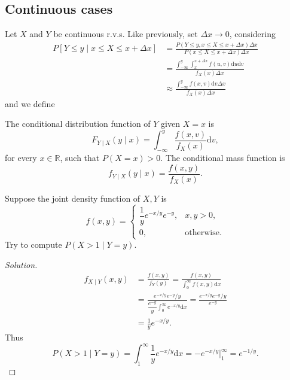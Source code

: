 \documentclass[11pt,singlecolumn, openany, citestyle=authoryear]{elegantbook}
\begin{document}
\begin{CJK}{UTF8}{gbsn}
\subsection{Continuous cases}
Let $X$ and $Y$ be continuous r.v.s. Like previously, set $\Delta x \to 0$, considering
\begin{align*}
    P[Y\leqslant y \mid x \leqslant X \leqslant x+\Delta x] &= 
    \frac{P(Y\leqslant y, x \leqslant X \leqslant x+\Delta x)\Delta x}
    {P(x \leqslant X \leqslant x+\Delta x)\Delta x}\\
    &= \frac{\displaystyle \int_{-\infty}^y \int_x^{x+\Delta x}
    f(u,v)\mathrm{d}u\mathrm{d}v}{f_X(x)\Delta x}\\
    &\approx \frac{\displaystyle \int_{-\infty}^y
    f(x,v)\mathrm{d}v\Delta x}{f_X(x)\Delta x}
\end{align*}
and we define
\begin{definition}
    The conditional distribution function of $Y$ given $X=x$ is 
    \begin{equation}
        F_{Y\mid X}(y\mid x) = \int_{-\infty}^y \frac{f(x,v)}{f_X(x)}\mathrm{d}v, 
    \end{equation} 
    for every $x \in \mathbb{R}$, such that $P(X=x)>0$.
    The conditional mass function is 
    \begin{equation}\label{eq:eq4}
        f_{Y\mid X}(y \mid x)=\frac{f(x,y)}{f_X(x)}.
    \end{equation}
\end{definition}

\begin{example}
    Suppose the joint density function of $X,Y$ is 
    $$f(x,y)=
    \begin{cases}
        \dfrac{1}{y}e^{-x/y}e^{-y}, & x,y > 0,\\
        0,& \text{otherwise}.
    \end{cases}
    $$
    Try to compute $P(X>1\mid Y=y)$.
\end{example}
\begin{proof}[Solution]
    \begin{align*}
        f_{X\mid Y}(x,y) &= \frac{f(x,y)}{f_Y(y)} = 
        \frac{f(x,y)}{\displaystyle \int_{0}^\infty f(x,y)\mathrm{d}x}\\
        &=\frac{e^{-x/y}e^{-y}/y}{\dfrac{e^{-y}}{y}\displaystyle 
        \int_{0}^\infty e^{-x/y}\mathrm{d}x}
        = \frac{e^{-x/y}e^{-y}/y}{e^{-y}}\\
        &= \frac{1}{y}e^{-x/y}.
    \end{align*}
    Thus 
    $$
    P(X>1\mid Y=y)=\int_1^\infty \frac{1}{y}e^{-x/y}\mathrm{d}x =  
    -e^{-x/y}\bigg|_1^\infty = e^{-1/y}.
    $$
\end{proof}


\end{CJK}
\end{document}
